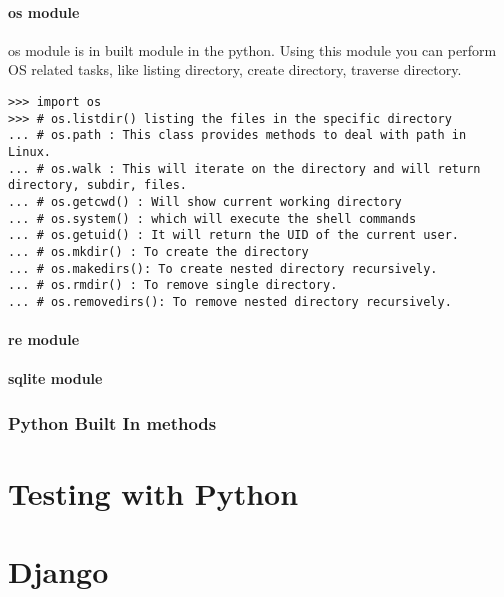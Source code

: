 \documentclass[letterpaper,12pt]{book}
\begin{document}
\subsection{os module}
os module is in built module in the python. Using this module you can perform OS related tasks, like listing directory, create directory, traverse directory.
\begin{lstlisting}
>>> import os
>>> # os.listdir() listing the files in the specific directory
... # os.path : This class provides methods to deal with path in Linux.
... # os.walk : This will iterate on the directory and will return directory, subdir, files.
... # os.getcwd() : Will show current working directory
... # os.system() : which will execute the shell commands
... # os.getuid() : It will return the UID of the current user.
... # os.mkdir() : To create the directory
... # os.makedirs(): To create nested directory recursively.
... # os.rmdir() : To remove single directory.
... # os.removedirs(): To remove nested directory recursively.

\end{lstlisting}
\subsection{re module}
\subsection{sqlite module}
\section{Python Built In methods}
\part{Testing with Python}
\part{Django}
\end{document}
